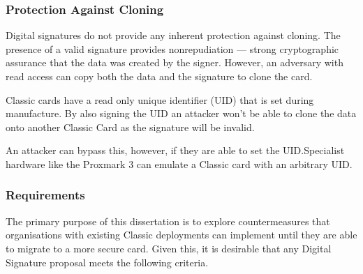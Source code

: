 \documentclass[dissertation.tex]{subfiles}
\begin{document}
  \subsubsection{Protection Against Cloning}
  Digital signatures do not provide any inherent protection against cloning. The presence of a valid signature provides nonrepudiation --- strong cryptographic assurance that the data was created by the signer. However, an adversary with read access can copy both the data and the signature to clone the card.

  \mifare{} Classic cards have a read only unique identifier (UID) that is set during manufacture. By also signing the UID an attacker won't be able to clone the data onto another \mifare{} Classic Card as the signature will be invalid.

  An attacker can bypass this, however, if they are able to set the UID.\@ Specialist hardware like the Proxmark 3 can emulate a \mifare{} Classic card with an arbitrary UID.\@

  \subsubsection{Requirements}
  The primary purpose of this dissertation is to explore countermeasures that organisations with existing \mifare{} Classic deployments can implement until they are able to migrate to a more secure card. Given this, it is desirable that any Digital Signature proposal meets the following criteria.
\end{document}
